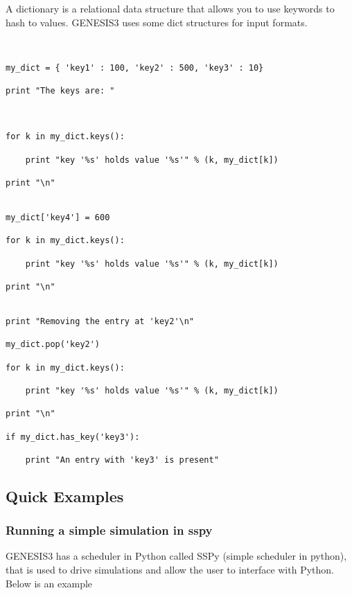\documentclass[12pt]{article}
\begin{document}
A dictionary is a relational data structure that allows you to use keywords to hash to values. GENESIS3 uses some dict structures for input formats.

\begin{verbatim}


my_dict = { 'key1' : 100, 'key2' : 500, 'key3' : 10}

print "The keys are: "


    
for k in my_dict.keys():

    print "key '%s' holds value '%s'" % (k, my_dict[k])

print "\n"


my_dict['key4'] = 600

for k in my_dict.keys():

    print "key '%s' holds value '%s'" % (k, my_dict[k])

print "\n"


print "Removing the entry at 'key2'\n"

my_dict.pop('key2')

for k in my_dict.keys():

    print "key '%s' holds value '%s'" % (k, my_dict[k])

print "\n"

if my_dict.has_key('key3'):

    print "An entry with 'key3' is present"

\end{verbatim}


\subsection*{Quick Examples}


\subsubsection*{Running a simple simulation in sspy}

GENESIS3 has a scheduler in Python called SSPy (simple scheduler in python), that is used to drive simulations and allow the user to interface with Python. Below is an example 
\end{document}
